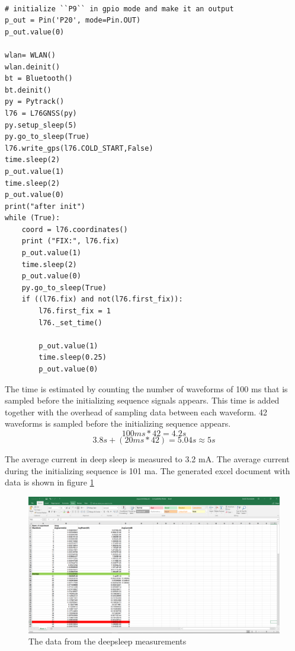 \lstset{language=Python}          %
\begin{lstlisting}[frame=single,caption = main.py for deepsleep measurement]  % Start your code-block

# initialize ``P9`` in gpio mode and make it an output
p_out = Pin('P20', mode=Pin.OUT)
p_out.value(0)

wlan= WLAN()
wlan.deinit()
bt = Bluetooth()
bt.deinit()
py = Pytrack()
l76 = L76GNSS(py)
py.setup_sleep(5)
py.go_to_sleep(True)
l76.write_gps(l76.COLD_START,False)
time.sleep(2)
p_out.value(1)
time.sleep(2)
p_out.value(0)
print("after init")
while (True):
    coord = l76.coordinates()
    print ("FIX:", l76.fix)
    p_out.value(1)
    time.sleep(2)
    p_out.value(0)
    py.go_to_sleep(True)
    if ((l76.fix) and not(l76.first_fix)):
        l76.first_fix = 1
        l76._set_time()

        p_out.value(1)
        time.sleep(0.25)
        p_out.value(0)
\end{lstlisting}
\label{code:deepsleep}


The time is estimated by counting the number of waveforms of 100 ms that is sampled before the initializing sequence signals appears. This time is added together with the overhead of sampling data between each waveform. 42 waveforms is sampled before the initializing sequence appears. 
\begin{equation}
100 ms * 42 = 4.2 s
\end{equation}
\begin{equation}
3.8 s + (20ms*42) = 5.04 s \approx  5 s
\end{equation}

The average current in deep sleep is measured to 3.2 mA. The average current during the initializing sequence is 101 ma. The generated excel document with data is shown in figure \ref{fig:deepsleep}

\begin{figure}[H]
\centering
\includegraphics[width=16 cm]{Project_Report/Images/sleep.PNG}
\caption{The data from the deepsleep measurements}
\label{fig:deepsleep}
\end{figure}















\newpage